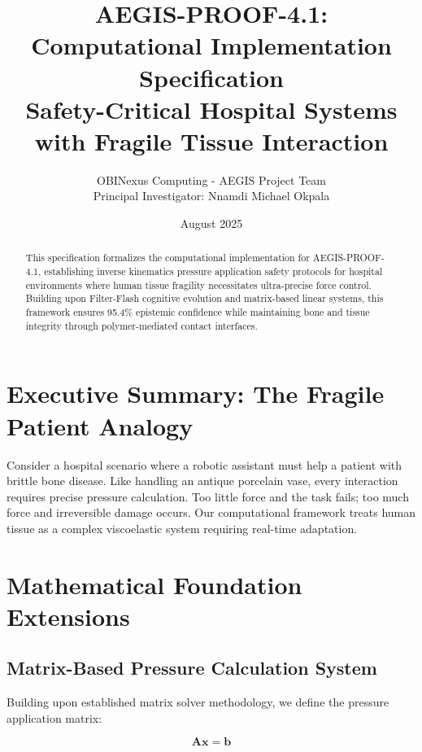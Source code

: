 \documentclass[11pt]{article}
\title{AEGIS-PROOF-4.1: Computational Implementation Specification\\
Safety-Critical Hospital Systems with Fragile Tissue Interaction}
\author{OBINexus Computing - AEGIS Project Team\\
Principal Investigator: Nnamdi Michael Okpala}
\date{August 2025}
\begin{document}
\maketitle

\begin{abstract}
This specification formalizes the computational implementation for AEGIS-PROOF-4.1, establishing inverse kinematics pressure application safety protocols for hospital environments where human tissue fragility necessitates ultra-precise force control. Building upon Filter-Flash cognitive evolution and matrix-based linear systems, this framework ensures 95.4\% epistemic confidence while maintaining bone and tissue integrity through polymer-mediated contact interfaces.
\end{abstract}

\section{Executive Summary: The Fragile Patient Analogy}

Consider a hospital scenario where a robotic assistant must help a patient with brittle bone disease. Like handling an antique porcelain vase, every interaction requires precise pressure calculation. Too little force and the task fails; too much force and irreversible damage occurs. Our computational framework treats human tissue as a complex viscoelastic system requiring real-time adaptation.

\section{Mathematical Foundation Extensions}

\subsection{Matrix-Based Pressure Calculation System}

Building upon established matrix solver methodology, we define the pressure application matrix:

\begin{equation}
\mathbf{A}\mathbf{x} = \mathbf{b}
\end{equation}
\end{document}
